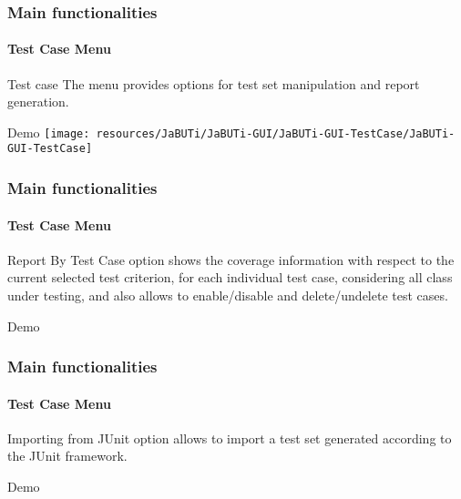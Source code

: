 \begin{frame}[parent={cmap:jabuti-gui},hasnext=true,hasprev=true]
\frametitle{Main functionalities}
\framesubtitle{Test Case Menu}
\label{concept:test-case-menu}

\begin{block}{Test case}
The  menu provides options for test set manipulation and
report generation.
\end{block}

\begin{block}{Demo}
\texttt{[image: resources/JaBUTi/JaBUTi-GUI/JaBUTi-GUI-TestCase/JaBUTi-GUI-TestCase]}
\end{block}
\end{frame}



\begin{frame}
\frametitle{Main functionalities}
\framesubtitle{Test Case Menu}
\label{concept:report-by-test-case}

\begin{block}{Report By Test Case}
 option shows the coverage information with
respect to the current selected test criterion, for each individual test case,
considering all class under testing, and also allows to enable/disable and
delete/undelete test cases.
\end{block}

\begin{block}{Demo}
\end{block}
\end{frame}



\begin{frame}
\frametitle{Main functionalities}
\framesubtitle{Test Case Menu}
\label{concept:importing-from-junit}

\begin{block}{Importing from JUnit}
 option allows to import a test set generated
according to the JUnit framework.
\end{block}

\begin{block}{Demo}
\end{block}
\end{frame}